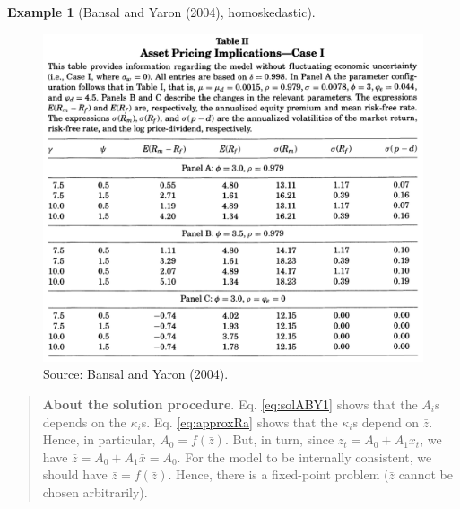 \documentclass[
  12pt,
]{book}
\theoremstyle{definition}
\theoremstyle{definition}
\newtheorem{example}{Example}[chapter]
\theoremstyle{definition}
\theoremstyle{definition}
\theoremstyle{remark}
\begin{document}
\begin{example}[Bansal and Yaron (2004), homoskedastic]
\begin{figure}

{\centering \includegraphics[width=1\linewidth]{figures/table_BY2} 

}

\caption{Source: Bansal and Yaron (2004).}\label{fig:BY2}
\end{figure}

\end{example}

\begin{quote}
\textbf{About the solution procedure}. Eq. \eqref{eq:solABY1} shows that the \(A_i\)s depends on the \(\kappa_i\)s. Eq. \eqref{eq:approxRa} shows that the \(\kappa_i\)s depend on \(\bar{z}\).
Hence, in particular, \(A_0 = f(\bar{z})\). But, in turn, since \(z_t = A_0 + A_1 x_t\), we have \(\bar{z}=A_0 + A_1 \bar{x}=A_0\). For the model to be internally consistent, we should have \(\bar{z}=f(\bar{z})\). Hence, there is a fixed-point problem (\(\bar{z}\) cannot be chosen arbitrarily).
\end{quote}
\end{document}
